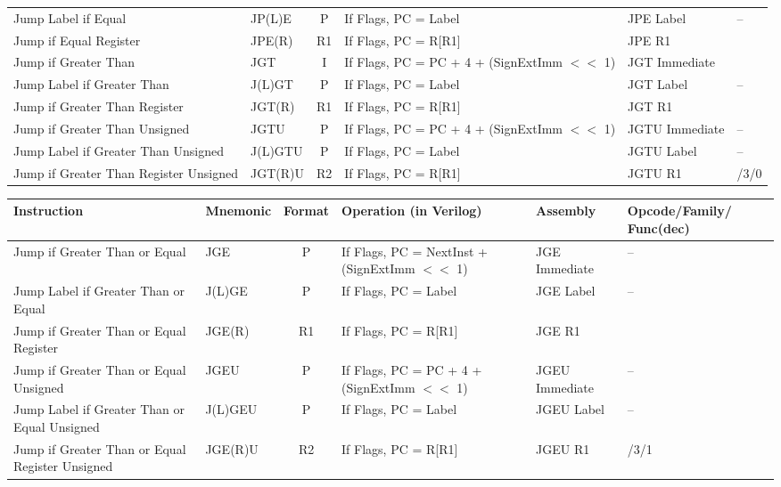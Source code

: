 \documentclass[a4paper,10pt]{article}
\begin{document}
\begin{tabular}{>{\raggedright\arraybackslash\hangindent=0.2cm\hangafter=1}p{2.5cm}lc>{\raggedright\arraybackslash\hangindent=2.5cm\hangafter=1}p{5.7cm}l>{\centering\arraybackslash}p{2cm}}
Jump Label if Equal & JP(L)E & P & If Flags, PC = Label & JPE Label & --\\
Jump if Equal Register & JPE(R) & R1 & If Flags, PC = R[R1] & JPE R1 & 13\\
Jump if Greater Than & JGT & I & If Flags, PC = PC + 4 + (SignExtImm $<<$ 1) & JGT Immediate & 11\\
Jump Label if Greater Than & J(L)GT & P & If Flags, PC = Label & JGT Label & --\\
Jump if Greater Than Register & JGT(R) & R1 & If Flags, PC = R[R1] & JGT R1 & 14\\
Jump if Greater Than Unsigned & JGTU & P & If Flags, PC = PC + 4 + (SignExtImm $<<$ 1) & JGTU Immediate & --\\
Jump Label if Greater Than Unsigned & J(L)GTU & P & If Flags, PC = Label & JGTU Label & --\\
Jump if Greater Than Register Unsigned & JGT(R)U & R2 & If Flags, PC = R[R1] & JGTU R1 & 13/3/0\\
\bottomrule
\end{tabular}
\begin{tabular}{>{\raggedright\arraybackslash\hangindent=0.2cm\hangafter=1}p{2.5cm}lc>{\raggedright\arraybackslash\hangindent=2.5cm\hangafter=1}p{5.7cm}l>{\centering\arraybackslash}p{2cm}}
\toprule
Instruction & Mnemonic & Format & Operation (in Verilog) & Assembly & Opcode/Family/ Func(dec) \\
\midrule
Jump if Greater Than or Equal & JGE & P & If Flags, PC = NextInst + (SignExtImm $<<$ 1) & JGE Immediate & --\\
Jump Label if Greater Than or Equal & J(L)GE & P & If Flags, PC = Label & JGE Label & --\\
Jump if Greater Than or Equal Register & JGE(R) & R1 & If Flags, PC = R[R1] & JGE R1 & 15\\
Jump if Greater Than or Equal Unsigned & JGEU & P & If Flags, PC = PC + 4 + (SignExtImm $<<$ 1) & JGEU Immediate & --\\
Jump Label if Greater Than or Equal Unsigned & J(L)GEU & P & If Flags, PC = Label & JGEU Label & --\\
Jump if Greater Than or Equal Register Unsigned & JGE(R)U & R2 & If Flags, PC = R[R1] & JGEU R1 & 13/3/1\\
\bottomrule
\end{tabular}

 
\end{document}
